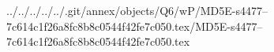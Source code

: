 ../../../../../.git/annex/objects/Q6/wP/MD5E-s4477--7c614c1f26a8fc8b8c0544f42fe7c050.tex/MD5E-s4477--7c614c1f26a8fc8b8c0544f42fe7c050.tex